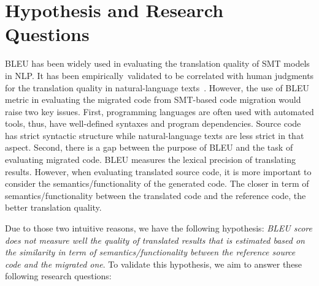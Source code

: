 \section{Hypothesis and Research Questions}

BLEU has been widely used in evaluating the translation quality of SMT
models in NLP. It has been empirically~validated to be correlated with
human judgments for the translation quality in natural-language
texts~\cite{Papineni2002}.
%
%
However, the use of BLEU metric in evaluating the migrated code from
SMT-based code migration would raise two key issues. First,
programming languages are often used with automated tools, thus, have
well-defined syntaxes and program dependencies. Source code has strict
syntactic structure while natural-language texts are less strict in
that aspect.
%
%
Second, there is a gap between the purpose of BLEU and the task of
evaluating migrated code. BLEU measures the lexical precision of
translating results. However, when evaluating translated source code,
it is more important to consider the semantics/functionality of
the generated code.
%
The closer in term of semantics/functionality between the translated
code and the reference code, the better translation quality.
%

Due to those two intuitive reasons, we have the following hypothesis:
{\em BLEU score does not measure well the quality of translated results
that is estimated based on the similarity in term of
semantics/functionality between the reference source code and the migrated one}. To validate
this hypothesis, we aim to answer these following research questions:
%

